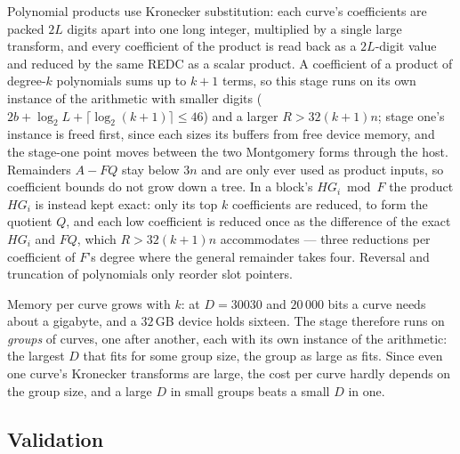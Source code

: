 \documentclass[11pt,a4paper]{article}
\begin{document}
Polynomial products use Kronecker substitution: each curve's coefficients are packed $2L$ digits
apart into one long integer, multiplied by a single large transform, and every coefficient of
the product is read back as a $2L$-digit value and reduced by the same REDC as a scalar product.
A coefficient of a product of degree-$k$ polynomials sums up to $k + 1$ terms, so this stage
runs on its own instance of the arithmetic with smaller digits ($2b + \log_2 L + \lceil\log_2(k+1)\rceil \le
46$) and a larger $R > 32(k+1)n$; stage one's instance is freed first, since each sizes its
buffers from free device memory, and the stage-one point moves between the two Montgomery forms
through the host. Remainders $A - FQ$ stay below $3n$ and are only ever used as product inputs,
so coefficient bounds do not grow down a tree. In a block's
$H G_i \bmod F$ the product $HG_i$ is instead kept exact: only its top $k$ coefficients are
reduced, to form the quotient $Q$, and each low coefficient is reduced once as the difference
of the exact $HG_i$ and $FQ$, which $R > 32(k+1)n$ accommodates --- three reductions per
coefficient of $F$'s degree where
the general remainder takes four. Reversal and truncation of polynomials only reorder slot
pointers.

Memory per curve grows with $k$: at $D = 30030$ and $20\,000$ bits a curve needs about a
gigabyte, and a $32$\,GB device holds sixteen. The stage therefore runs on \emph{groups} of curves,
one after another, each with its own instance of the arithmetic: the largest $D$ that fits for
some group size, the group as large as fits. Since even one curve's Kronecker transforms are
large, the cost per curve hardly depends on the group size, and a large $D$ in small groups
beats a small $D$ in one.

\subsection{Validation}
\end{document}
